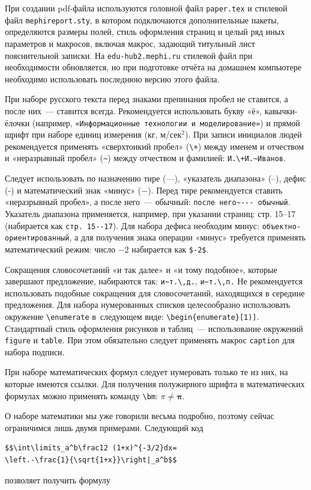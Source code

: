 При создании pdf-файла используются головной файл \texttt{paper.tex} и 
стилевой файл \texttt{mеphireport.sty}, в котором подключаются 
дополнительные 
пакеты, определяются размеры полей, стиль оформления страниц и целый ряд иных 
параметров и макросов, включая макрос, задающий титульный лист пояснительной
записки. На \texttt{edu-hub2.mephi.ru} стилевой файл при необходимости
обновляется, но при подготовке отчёта на домашнем компьютере необходимо
использовать последнюю версию этого файла.

При наборе русского текста перед знаками препинания пробел не ставится, 
а после них~--- ставится всегда. Рекомендуется использовать букву «ё», 
кавычки-ёлочки 
(например, \verb|«Информационные технологии и моделирование»|) и
прямой шрифт при наборе единиц измерения (кг, м/сек${}^2$).
При записи инициалов людей рекомендуется применять «сверхтонкий пробел» 
(\verb|\+|) между именем и отчеством и «неразрывный пробел» (\verb|~|) между
отчеством и фамилией: \verb|И.\+И.~Иванов|. 

Следует использовать по назначению тире
(---), «указатель диапазона» (--), дефис (-) и математический знак «минус»
($-$). Перед тире рекомендуется ставить «неразрывный
пробел», а после него~--- обычный: \verb|после него~--- обычный|. Указатель
диапазона применяется, например, при указании страниц: стр. 15--17
(набирается как \verb|стр. 15--17|). Для набора дефиса необходим минус: 
\verb|объектно-ориентированный|, а для получения знака операции  «минус»
требуется применять математический режим: число $-2$ набирается как
\verb|$-2$|. 

Сокращения словосочетаний «и так далее» и «и тому подобное», которые
завершают предложение, набираются так: \verb|и~т.\,д.|, \verb|и~т.\,п.|
Не рекомендуется использовать подобные сокращения для словосочетаний,
находящихся в середине предложения. Для набора нумерованных списков 
целесообразно использовать окружение \verb|\enumerate| в~следующем виде:
\verb|\begin{enumerate}[1)]|.
Стандартный стиль оформления рисунков и таблиц~--- использование окружений
\verb|figure| и \verb|table|. При этом обязательно следует применять макрос
\verb|caption| для набора подписи. 

При наборе математических формул следует нумеровать только те из них, на
которые имеются ссылки. Для получения полужирного шрифта в математических
формулах можно применять команду \verb|\bm|: $\pi \ne \bm\pi$.

О наборе математики мы уже говорили весьма подробно, поэтому сейчас 
ограничимся лишь двумя примерами. Следующий код
\begin{small}
\begin{verbatim}
$$\int\limits_a^b\frac12 (1+x)^{-3/2}dx=
\left.-\frac{1}{\sqrt{1+x}}\right|_a^b$$
\end{verbatim}
\end{small}
\noindent позволяет получить формулу

